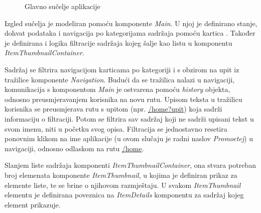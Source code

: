 \documentclass[times, utf8, zavrsni, numeric]{fer}
\newcommand{\razmakp}{\vspace{18pt}}
\newcommand{\razmaks}{\vspace{10pt}}
\begin{document}
\razmaks

\begin{figure}[htb]
\centering
{}
\caption{Glavno sučelje aplikacije}
\label{fig:screenshot-main}
\end{figure}

\razmaks

Izgled sučelja je modeliran pomoću komponente \emph{Main}.
U njoj je definirano stanje, dohvat podataka i navigacija po kategorijama sadržaja pomoću kartica .
Također je definirana i logika filtracije sadržaja kojeg šalje kao listu u komponentu \emph{ItemThumbnailContainer}.

Sadržaj se filtrira navigacijom karticama po kategoriji i s obzirom na upit iz tražilice komponente \emph{Navigation}. 
Budući da se tražilica nalazi u navigaciji, komunikacija s komponentom \emph{Main} je ostvarena pomoću \emph{history} objekta, odnosno preusmjeravanjem korisnika na novu rutu.
Upisom teksta u tražilicu korisnika se preusmjerava rutu s upitom (npr. \glqq \url{/home?upit}\grqq ) koja sadrži informaciju o filtraciji.
Potom se filtrira sav sadržaj koji ne sadrži upisani tekst u svom imenu, niti u početku svog opisa.
Filtracija se jednostavno resetira ponovnim klikom na ime aplikacije (u ovom slučaju je radni naslov \emph{Promoetej}) u navigaciji, odnosno odlaskom na rutu \glqq \url{/home}\grqq .

Slanjem liste sadržaja komponenti \emph{ItemThumbnailContainer}, ona stvara potreban broj elemenata komponente \emph{ItemThumbnail}, u kojima je definiran prikaz za elemente liste, te se brine o njihovom razmještaju.
U svakom \emph{ItemThumbnail} elementu je definirana poveznica na \emph{ItemDetails} komponentu za sadržaj kojeg element prikazuje.

\razmakp
\end{document}
